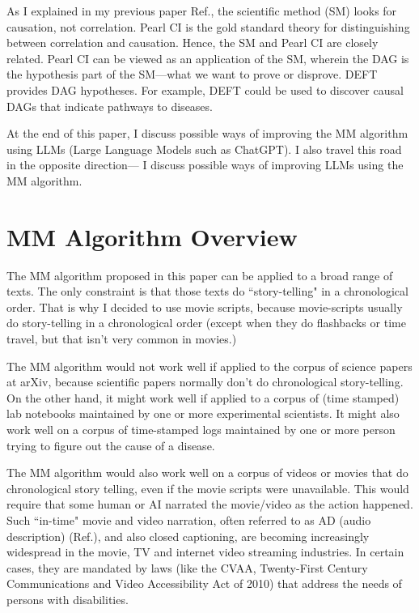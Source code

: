 \documentclass[12pt]{article}
\begin{document}
As I explained in my previous paper Ref.\cite{deft1}, the scientific method (SM) looks for causation, not correlation. Pearl CI is the gold standard theory for distinguishing
between correlation and causation.
Hence, the SM and Pearl CI are closely related.
Pearl CI can be viewed as an application of the SM, wherein the DAG is the hypothesis part of the SM---what we want to  
prove or disprove.
DEFT provides DAG hypotheses.
For example,
DEFT could be used to discover causal DAGs that indicate pathways to diseases.

At the end of this paper, I discuss possible ways of improving the MM algorithm 
using LLMs (Large
Language Models such as ChatGPT).
I also travel this road in the opposite direction---
I discuss
possible ways of improving
LLMs using the MM algorithm.


\section{MM Algorithm Overview}
\label{sec-algo-overview}
The MM algorithm proposed in this
paper can be applied to a broad range of texts. The only constraint is that those texts 
do ``story-telling" in a chronological order.
That is why I decided to use movie scripts,
because movie-scripts usually do story-telling in a chronological order (except when they do 
flashbacks or time travel, but that isn't very
common in movies.)

The MM algorithm would not work well
if applied to the corpus of science papers at arXiv,
because scientific papers normally don't do chronological story-telling. 
On the other hand,
it might work well if applied to a corpus of (time stamped) lab notebooks maintained by one or more experimental scientists.
It might also work well on a corpus of time-stamped logs maintained by one or more person
trying to figure out the cause of a disease.

The MM algorithm would also
work well on a corpus of videos or movies that
do chronological story telling,
even if the movie scripts were unavailable. This
would require that  
some human or AI
narrated the movie/video as the action happened. Such ``in-time" movie and video narration,
often referred to as AD (audio description)
(Ref.\cite{audio-description}),
and also closed captioning, are becoming 
increasingly
widespread in the movie, TV and internet video streaming industries. In certain cases, 
they are mandated by laws 
(like the CVAA, Twenty-First Century Communications and Video Accessibility Act of 2010) that
address the needs of persons with disabilities.
\end{document}
